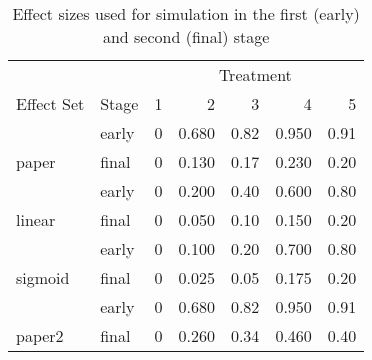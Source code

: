 \begin{table}

\caption{Effect sizes used for simulation in the first (early) and second (final) stage}
\centering
\begin{tabular}[t]{llrrrrr}
\toprule
\multicolumn{2}{c}{ } & \multicolumn{5}{c}{Treatment} \\
\cmidrule(l{3pt}r{3pt}){3-7}
Effect Set & Stage & 1 & 2 & 3 & 4 & 5\\
\midrule
 & early & 0 & 0.680 & 0.82 & 0.950 & 0.91\\

\multirow{-2}{*}{\raggedright\arraybackslash paper} & final & 0 & 0.130 & 0.17 & 0.230 & 0.20\\
\cmidrule{1-7}
 & early & 0 & 0.200 & 0.40 & 0.600 & 0.80\\

\multirow{-2}{*}{\raggedright\arraybackslash linear} & final & 0 & 0.050 & 0.10 & 0.150 & 0.20\\
\cmidrule{1-7}
 & early & 0 & 0.100 & 0.20 & 0.700 & 0.80\\

\multirow{-2}{*}{\raggedright\arraybackslash sigmoid} & final & 0 & 0.025 & 0.05 & 0.175 & 0.20\\
\cmidrule{1-7}
 & early & 0 & 0.680 & 0.82 & 0.950 & 0.91\\

\multirow{-2}{*}{\raggedright\arraybackslash paper2} & final & 0 & 0.260 & 0.34 & 0.460 & 0.40\\
\bottomrule
\end{tabular}
\end{table}
